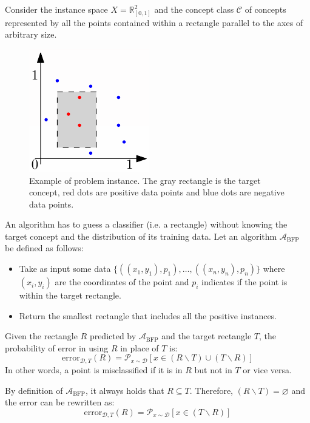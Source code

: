 \begin{example}
    Consider the instance space $X = \mathbb{R}^2_{[0, 1]}$
    and the concept class $\mathcal{C}$ of concepts represented by all the points contained within a rectangle parallel to the axes of arbitrary size.

    \begin{figure}[H]
        \centering
        \includegraphics[width=0.2\linewidth]{./img/_learning_rectangle.pdf}
        \caption{Example of problem instance. The gray rectangle is the target concept, red dots are positive data points and blue dots are negative data points.}
    \end{figure}

    An algorithm has to guess a classifier (i.e. a rectangle) without knowing the target concept and the distribution of its training data.
    Let an algorithm $\mathcal{A}_\text{BFP}$ be defined as follows:
    \begin{itemize}
        \item Take as input some data $\{ ((x_1, y_1), p_1), \dots, ((x_n, y_n), p_n) \}$ where 
            $(x_i, y_i)$ are the coordinates of the point and $p_i$ indicates if the point is within the target rectangle.
        \item Return the smallest rectangle that includes all the positive instances.
    \end{itemize}

    Given the rectangle $R$ predicted by $\mathcal{A}_\text{BFP}$ and the target rectangle $T$,
    the probability of error in using $R$ in place of $T$ is:
    \[ \text{error}_{\mathcal{D}, T}(R) = \mathcal{P}_{x \sim \mathcal{D}} [ x \in (R \smallsetminus T) \cup (T \smallsetminus R) ] \]
    In other words, a point is misclassified if it is in $R$ but not in $T$ or vice versa.
    \begin{remark}
        By definition of $\mathcal{A}_\text{BFP}$, it always holds that $R \subseteq T$. 
        Therefore, $(R \smallsetminus T) = \varnothing$ and the error can be rewritten as:
        \[ \text{error}_{\mathcal{D}, T}(R) = \mathcal{P}_{x \sim \mathcal{D}} [ x \in (T \smallsetminus R) ] \]
    \end{remark}



\end{example}
